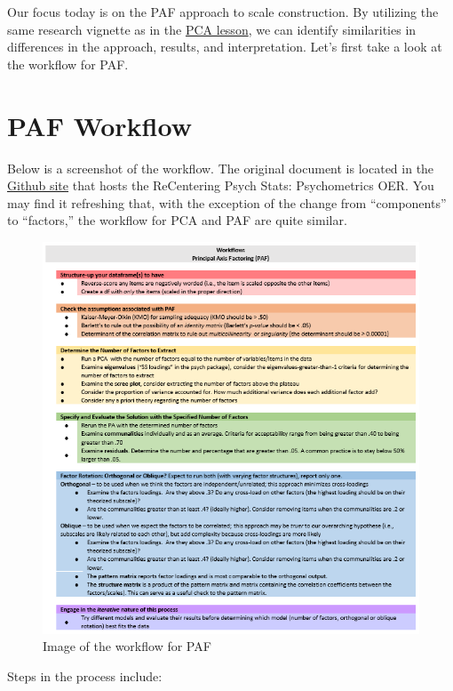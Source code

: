 \documentclass[
  english,
]{book}
\begin{document}
Our focus today is on the PAF approach to scale construction. By utilizing the same research vignette as in the \protect\hyperlink{PCA}{PCA lesson}, we can identify similarities in differences in the approach, results, and interpretation. Let's first take a look at the workflow for PAF.

\hypertarget{paf-workflow}{%
\section{PAF Workflow}\label{paf-workflow}}

Below is a screenshot of the workflow. The original document is located in the \href{https://github.com/lhbikos/ReC_Psychometrics}{Github site} that hosts the ReCentering Psych Stats: Psychometrics OER. You may find it refreshing that, with the exception of the change from ``components'' to ``factors,'' the workflow for PCA and PAF are quite similar.

\begin{figure}
\centering
\includegraphics{images/PAF/PAFworkflow.png}
\caption{Image of the workflow for PAF}
\end{figure}

Steps in the process include:
\end{document}

